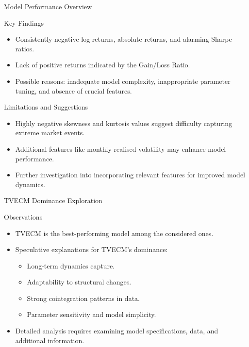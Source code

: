 \documentclass{beamer}
\begin{document}
\begin{frame}{Model Performance Overview}
    \begin{block}{Key Findings}
        \begin{itemize}
            \item Consistently negative log returns, absolute returns, and alarming Sharpe ratios.
            \item Lack of positive returns indicated by the Gain/Loss Ratio.
            \item Possible reasons: inadequate model complexity, inappropriate parameter tuning, and absence of crucial features.
        \end{itemize}
    \end{block}

    \begin{block}{Limitations and Suggestions}
        \begin{itemize}
            \item Highly negative skewness and kurtosis values suggest difficulty capturing extreme market events.
            \item Additional features like monthly realised volatility may enhance model performance.
            \item Further investigation into incorporating relevant features for improved model dynamics.
        \end{itemize}
    \end{block}
\end{frame}

\begin{frame}{TVECM Dominance Exploration}
    \begin{block}{Observations}
        \begin{itemize}
            \item TVECM is the best-performing model among the considered ones.
            \item Speculative explanations for TVECM's dominance:
                \begin{itemize}
                    \item Long-term dynamics capture.
                    \item Adaptability to structural changes.
                    \item Strong cointegration patterns in data.
                    \item Parameter sensitivity and model simplicity.
                \end{itemize}
            \item Detailed analysis requires examining model specifications, data, and additional information.
        \end{itemize}
    \end{block}
\end{frame}
\end{document}

